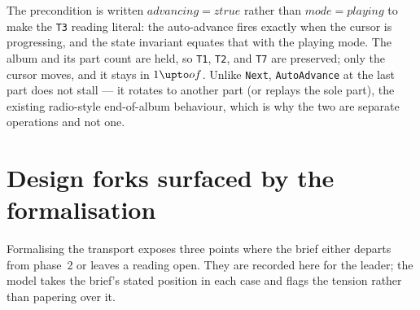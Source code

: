 \documentclass[a4paper,10pt,fleqn]{article}
\begin{document}
The precondition is written $advancing = ztrue$ rather than $mode = playing$ to
make the \texttt{T3} reading literal: the auto-advance fires exactly when the
cursor is progressing, and the state invariant equates that with the playing
mode. The album and its part count are held, so \texttt{T1}, \texttt{T2}, and
\texttt{T7} are preserved; only the cursor moves, and it stays in $1 \upto of$.
Unlike \texttt{Next}, \texttt{AutoAdvance} at the last part does not stall --- it
rotates to another part (or replays the sole part), the existing radio-style
end-of-album behaviour, which is why the two are separate operations and not one.

\section{Design forks surfaced by the formalisation}
\label{sec:forks}

Formalising the transport exposes three points where the brief either departs
from phase~2 or leaves a reading open. They are recorded here for the leader; the
model takes the brief's stated position in each case and flags the tension rather
than papering over it.
\end{document}
